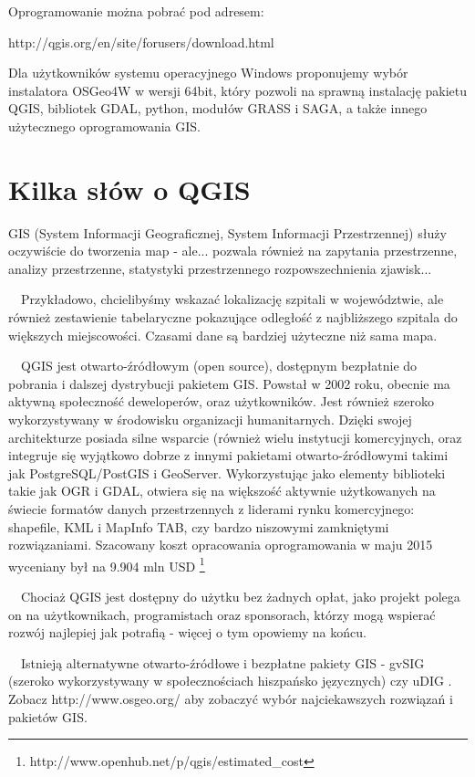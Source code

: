 \documentclass[12pt,a4paper]{book}
\begin{document}
Oprogramowanie można pobrać pod adresem:

http://qgis.org/en/site/forusers/download.html

Dla użytkowników systemu operacyjnego Windows proponujemy wybór instalatora OSGeo4W w wersji 64bit, który pozwoli na sprawną instalację pakietu QGIS, bibliotek GDAL, python, modułów GRASS i SAGA, a także innego użytecznego oprogramowania GIS.

\mainmatter
\chapter{Kilka słów o QGIS}
GIS (System Informacji Geograficznej, System Informacji Przestrzennej) służy oczywiście do tworzenia map - ale... pozwala również na zapytania przestrzenne, analizy przestrzenne, statystyki przestrzennego rozpowszechnienia zjawisk...

\ \ Przykładowo, chcielibyśmy wskazać lokalizację szpitali w województwie, ale również zestawienie tabelaryczne pokazujące odległość z najbliższego szpitala do większych miejscowości. Czasami dane są bardziej użyteczne niż sama mapa.

\ \ QGIS jest otwarto-źródłowym (open source), dostępnym bezpłatnie do pobrania i dalszej dystrybucji pakietem GIS. Powstał w 2002 roku, obecnie ma aktywną społeczność deweloperów, oraz użytkowników. Jest również szeroko wykorzystywany w środowisku organizacji humanitarnych. Dzięki swojej architekturze posiada silne wsparcie (również wielu instytucji komercyjnych, oraz integruje się wyjątkowo dobrze z innymi pakietami otwarto-źródłowymi takimi jak PostgreSQL/PostGIS i GeoServer. Wykorzystując jako elementy biblioteki takie jak OGR i GDAL, otwiera się na większość aktywnie użytkowanych na świecie formatów danych przestrzennych z liderami rynku komercyjnego: shapefile, KML i MapInfo TAB, czy bardzo niszowymi zamkniętymi rozwiązaniami. Szacowany koszt opracowania oprogramowania w maju 2015 wyceniany był na 9.904 mln USD \footnote{http://www.openhub.net/p/qgis/estimated\_cost}

\ \ Chociaż QGIS jest dostępny do użytku bez żadnych opłat, jako projekt polega on na użytkownikach, programistach oraz sponsorach, którzy mogą wspierać rozwój najlepiej jak potrafią - więcej o tym opowiemy na końcu.

\ \ Istnieją alternatywne otwarto-źródłowe i bezpłatne pakiety GIS - gvSIG (szeroko wykorzystywany w społecznościach hiszpańsko języcznych) czy uDIG . Zobacz http://www.osgeo.org/ aby zobaczyć wybór najciekawszych rozwiązań i pakietów GIS.
\end{document}

